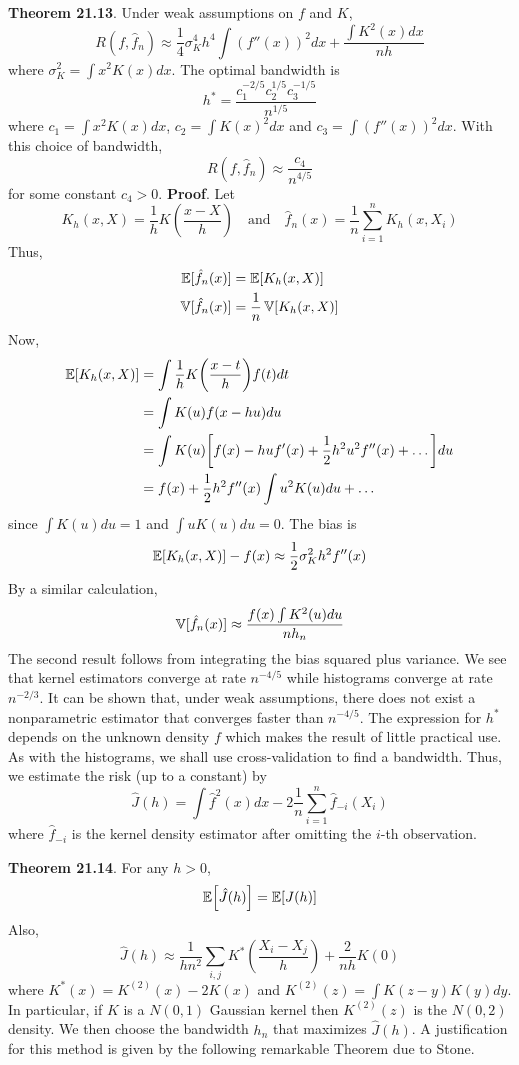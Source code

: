 \textbf{Theorem 21.13}. Under weak assumptions on \(f\) and \(K\),
\[
R(f, \hat{f}_{n}) \approx \frac{1}{4} \sigma_K^{4} h^{4} \int \left(f''(x)\right)^{2} dx + \frac{\int K^{2}(x) dx}{nh}
\]
where \(\sigma_K^{2} = \int x^{2} K(x) dx\). The optimal bandwidth is
\[
h^{*} = \frac{c_{1}^{-2/5} c_{2}^{1/5} c_{3}^{-1/5}}{n^{1/5}}
\]
where \(c_{1} = \int x^{2} K(x) dx\), \(c_{2} = \int K(x)^{2} dx\) and
\(c_{3} = \int \left( f''(x) \right)^{2} dx\). With this choice of
bandwidth,
\[
R(f, \hat{f}_{n}) \approx \frac{c_{4}}{n^{4/5}}
\]
for some constant \(c_{4} > 0\).
\textbf{Proof}. Let
\[
K_h(x, X) = \frac{1}{h} K\left( \frac{x - X}{h} \right)
\quad \text{and} \quad
\hat{f}_{n}(x) = \frac{1}{n} \sum_{i=1}^{n} K_h(x, X_{i})
\]
Thus, \begin{align*}
\operatorname{\mathbb{E}}[\hat{f}_{n}(x)] &= \operatorname{\mathbb{E}}[K_h(x, X)] \\
\operatorname{\mathbb{V}}[\hat{f}_{n}(x)] &= \frac{1}{n} \operatorname{\mathbb{V}}[K_h(x, X)]
\end{align*}
Now,
\begin{align*}
\EXP[K_h(x, X)] &= \int \frac{1}{h} K\left( \frac{x - t}{h} \right) f(t) dt \\
&= \int K(u) f(x - hu) du \\
&= \int K(u) \left[ f(x) - hu f'(x) + \frac{1}{2} h^{2}u^{2} f''(x) + \dots \right] du \\
&= f(x) + \frac{1}{2} h^{2} f''(x) \int u^{2} K(u) du + \dots
\end{align*}
since \(\int K(u) du = 1\) and \(\int u K(u) du = 0\). The bias is
\[
\operatorname{\mathbb{E}}[K_h(x, X)] - f(x) \approx \frac{1}{2} \sigma_K^{2} h^{2} f''(x)
\]
By a similar calculation,
\[
\operatorname{\mathbb{V}}[\hat{f}_{n}(x)] \approx \frac{f(x) \int K^{2}(u) du}{n h_{n}}
\]
The second result follows from integrating the bias squared plus variance.
We see that kernel estimators converge at rate \(n^{-4/5}\) while histograms converge at rate \(n^{-2/3}\). It can be shown that, under weak assumptions, there does not exist a nonparametric estimator that converges faster than \(n^{-4/5}\).
The expression for \(h^{*}\) depends on the unknown density \(f\) which makes the result of little practical use. As with the histograms, we shall use cross-validation to find a bandwidth. Thus, we estimate the risk (up to a constant) by
\[
\hat{J}(h) = \int \hat{f}^{2}(x) dx - 2 \frac{1}{n} \sum_{i=1}^{n} \hat{f}_{-i}(X_{i})
\]
where \(\hat{f}_{-i}\) is the kernel density estimator after omitting the \(i\)-th observation.

\textbf{Theorem 21.14}. For any \(h > 0\),
\[
\EXP \left[ \hat{J}(h) \right] = \EXP \left[ J(h) \right]
\]
Also,
\[
\hat{J}(h) \approx \frac{1}{hn^{2}}\sum_{i, j} K^{*} \left( \frac{X_{i} - X_{j}}{h} \right) + \frac{2}{nh} K(0)
\]
where \(K^{*}(x) = K^{(2)}(x) - 2 K(x)\) and \(K^{(2)}(z) = \int K(z - y) K(y) dy\). In particular, if \(K\) is a \(N(0, 1)\) Gaussian kernel then \(K^{(2)}(z)\) is the \(N(0, 2)\) density.
We then choose the bandwidth \(h_{n}\) that maximizes \(\hat{J}(h)\). A justification for this method is given by the following remarkable Theorem due to Stone.

